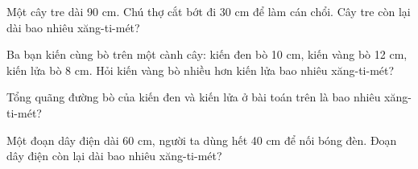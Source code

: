 \begin{ex} %
Một cây tre dài 90 cm. Chú thợ cắt bớt đi 30 cm để làm cán chổi. Cây tre còn lại dài bao nhiêu xăng-ti-mét?
\end{ex}

\begin{ex} %
Ba bạn kiến cùng bò trên một cành cây: kiến đen bò 10 cm, kiến vàng bò 12 cm, kiến lửa bò 8 cm. Hỏi kiến vàng bò nhiều hơn kiến lửa bao nhiêu xăng-ti-mét?
\end{ex}

\begin{ex} %
Tổng quãng đường bò của kiến đen và kiến lửa ở bài toán trên là bao nhiêu xăng-ti-mét?
\end{ex}

\begin{ex} %
Một đoạn dây điện dài 60 cm, người ta dùng hết 40 cm để nối bóng đèn. Đoạn dây điện còn lại dài bao nhiêu xăng-ti-mét?
\end{ex}
